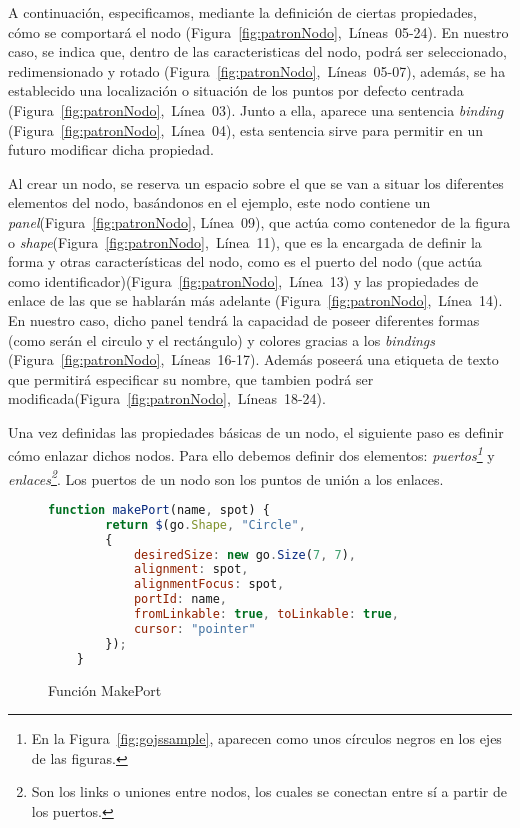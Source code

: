 A continuación, especificamos, mediante la definición de ciertas propiedades, cómo se comportará el nodo (Figura~\ref{fig:patronNodo},~Líneas~05-24). En nuestro caso, se indica que, dentro de las caracteristicas del nodo, podrá ser seleccionado, redimensionado y rotado (Figura~\ref{fig:patronNodo},~Líneas~05-07), además, se ha establecido una localización o situación de los puntos por defecto centrada (Figura~\ref{fig:patronNodo},~Línea~03). Junto a ella, aparece una sentencia  \emph{binding} (Figura~\ref{fig:patronNodo},~Línea~04), esta sentencia sirve para permitir en un futuro modificar dicha propiedad.

Al crear un nodo, se reserva un espacio sobre el que se van a situar los diferentes elementos del nodo, basándonos en el ejemplo, este nodo contiene un \emph{panel}(Figura~\ref{fig:patronNodo}, Línea~09), que actúa como contenedor de la figura o \emph{shape}(Figura~\ref{fig:patronNodo},~Línea~11), que es la encargada de definir la forma y otras características del nodo, como es el puerto del nodo (que actúa como identificador)(Figura~\ref{fig:patronNodo},~Línea~13) y las propiedades de enlace de las que se hablarán más adelante (Figura~\ref{fig:patronNodo},~Línea~14). En nuestro caso, dicho panel tendrá la capacidad de poseer diferentes formas (como serán el circulo y el rectángulo) y colores gracias a los \emph{bindings} (Figura~\ref{fig:patronNodo},~Líneas~16-17). Además poseerá una etiqueta de texto que permitirá especificar su nombre, que tambien podrá ser modificada(Figura~\ref{fig:patronNodo},~Líneas~18-24).

Una vez definidas las propiedades básicas de un nodo, el siguiente paso es definir cómo enlazar dichos nodos. Para ello debemos definir dos elementos: \emph{puertos\footnote{En la Figura~\ref{fig:gojssample}, aparecen como unos círculos negros en los ejes de las figuras.}} y \emph{enlaces\footnote{Son los links o uniones entre nodos, los cuales se conectan entre sí a partir de los puertos.}}. Los puertos de un nodo son los puntos de unión a los enlaces. 

\begin{figure}[!tb]
	\centering
	\begin{lstlisting}[language=JavaScript]
	function makePort(name, spot) {
		return $(go.Shape, "Circle",
		{
			desiredSize: new go.Size(7, 7),
			alignment: spot,  
			alignmentFocus: spot,  
			portId: name,  
			fromLinkable: true, toLinkable: true,  
			cursor: "pointer"  
		});
	}
	\end{lstlisting}
	\caption{Función MakePort}
	\label{fig:funcionMakeport}
\end{figure}
	
